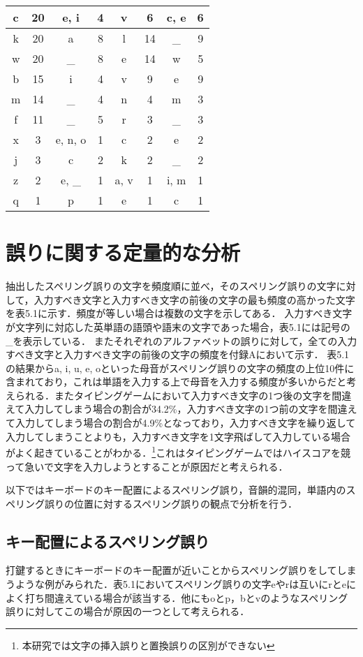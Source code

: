 {\begin{table*}[t]
\begin{center}
\begin{tabular}{|c|c|c|c|c|c|c|c|}
	    c & 20 & e, i & 4 & v & 6 & c, e & 6\\ \hline
	    k & 20 & a & 8 & l & 14 & \_ & 9\\ \hline
	    w & 20 & \_ & 8 & e & 14 & w & 5\\ \hline
	    b & 15 & i & 4 & v & 9 & e & 9\\ \hline
	    m & 14 & \_ & 4 & n & 4 & m & 3\\ \hline
	    f & 11 & \_ & 5 & r & 3 & \_ & 3\\ \hline
	    x & 3 & e, n, o & 1 & c & 2 & e & 2\\ \hline
	    j & 3 & c & 2 & k & 2 & \_ & 2\\ \hline
	    z & 2 & e, \_ & 1 & a, v & 1 & i, m & 1\\ \hline
	    q & 1 & p & 1 & e & 1 & c & 1\\ \hline
   \end{tabular}
  \end{center}
 \end{table*}
}
 
\section{誤りに関する定量的な分析}
抽出したスペリング誤りの文字を頻度順に並べ，そのスペリング誤りの文字に対して，入力すべき文字と入力すべき文字の前後の文字の最も頻度の高かった文字を表5.1に示す．頻度が等しい場合は複数の文字を示してある．
入力すべき文字が文字列に対応した英単語の語頭や語末の文字であった場合，表5.1には記号の\_を表示している．
またそれぞれのアルファベットの誤りに対して，全ての入力すべき文字と入力すべき文字の前後の文字の頻度を付録Aにおいて示す．
表5.1の結果からa, i, u, e, oといった母音がスペリング誤りの文字の頻度の上位10件に含まれており，これは単語を入力する上で母音を入力する頻度が多いからだと考えられる．またタイピングゲームにおいて入力すべき文字の1つ後の文字を間違えて入力してしまう場合の割合が34.2\%，入力すべき文字の1つ前の文字を間違えて入力してしまう場合の割合が4.9\%となっており，入力すべき文字を繰り返して入力してしまうことよりも，入力すべき文字を1文字飛ばして入力している場合がよく起きていることがわかる．\footnote{本研究では文字の挿入誤りと置換誤りの区別ができない}これはタイピングゲームではハイスコアを競って急いで文字を入力しようとすることが原因だと考えられる．

以下ではキーボードのキー配置によるスペリング誤り，音韻的混同，単語内のスペリング誤りの位置に対するスペリング誤りの観点で分析を行う．

\subsection{キー配置によるスペリング誤り}
打鍵するときにキーボードのキー配置が近いことからスペリング誤りをしてしまうような例がみられた．表5.1においてスペリング誤りの文字eやrは互いにrとeによく打ち間違えている場合が該当する．他にもoとp，bとvのようなスペリング誤りに対してこの場合が原因の一つとして考えられる．

